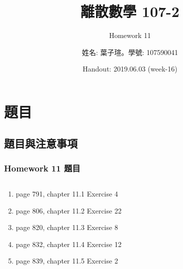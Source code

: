 \documentclass[12pt,hyperref={bookmarks=false}]{beamer}
\title{離散數學 107-2}
\subtitle{Homework 11}
\author{姓名: 葉子瑄。學號: 107590041}
\date{Handout: 2019.06.03 (week-16)}
\begin{document}

\begin{frame}
\titlepage
\end{frame}

\raggedright

\begin{frame}
\footnotesize
\tableofcontents
\end{frame}
	
\section{題目}

	\subsection{題目與注意事項}
	
	\begin{frame}
	\frametitle{Homework 11 題目}
	\fontsize{10pt}{11pt}\selectfont
	\setlength{\baselineskip}{5pt}
	\begin{columns}
	\begin{column}{0.68\textwidth}
	\begin{enumerate}[label=(Prob. \arabic*)]
	\setlength\itemsep{0em}
	\item page 791, chapter 11.1 Exercise 4
	\item page 806, chapter 11.2 Exercise 22
	\item page 820, chapter 11.3 Exercise 8
	\item page 832, chapter 11.4 Exercise 12
	\item page 839, chapter 11.5 Exercise 2
	\end{enumerate}
	\end{column}
	
	
	\end{columns}
	\end{frame}
	
\end{document}
